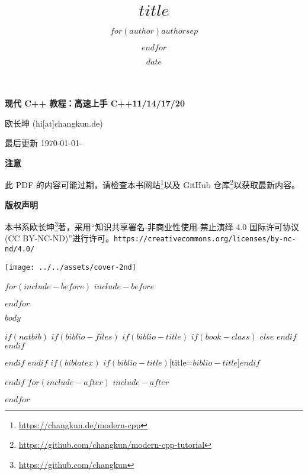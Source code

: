 \documentclass[a4paper, 10pt]{ctexart}
\title{$title$}
\author{$for(author)$$author$$sep$ \and $endfor$}
\date{$date$}
\makeatletter
\def\maxwidth{\ifdim\Gin@nat@width>\linewidth\linewidth
\else\Gin@nat@width\fi}
\let\Oldincludegraphics\includegraphics
\renewcommand{\includegraphics}[1]{\Oldincludegraphics[width=0.7\maxwidth]{#1}}
\renewcommand{\href}[2]{#2\footnote{\url{#1}}}
\makeatother
\begin{document}
\newcommand{\tightlist}{%
\setlength{\itemsep}{0pt}\setlength{\parskip}{0pt}}

\thispagestyle{plain}
\begin{center}
  
  {\LARGE\textbf{现代 C++ 教程：高速上手 C++11/14/17/20}}
  
  \vspace{1em}
  {\large 欧长坤 (hi[at]changkun.de)}
  
  \vspace{1ex}
  最后更新 \today - \revision

  \vspace{1ex}
  \textbf{注意}

  \noindent 此 PDF 的内容可能过期，请检查\href{https://changkun.de/modern-cpp}{本书网站}以及 \href{https://github.com/changkun/modern-cpp-tutorial}{GitHub 仓库}以获取最新内容。

  \vspace{1em}
  \textbf{\large 版权声明}

  \noindent 本书系\href{https://github.com/changkun}{欧长坤}著，采用“知识共享署名-非商业性使用-禁止演绎 4.0 国际许可协议 (CC BY-NC-ND)”进行许可。\texttt{\small https://creativecommons.org/licenses/by-nc-nd/4.0/}

  \vspace{7em}
  \texttt{[image: ../../assets/cover-2nd]}

\end{center}

$for(include-before)$
$include-before$

$endfor$

{
\newpage
\hypersetup{linkcolor=black}
\setcounter{tocdepth}{3}
\tableofcontents
}
\newpage

$body$

$if(natbib)$
$if(biblio-files)$
$if(biblio-title)$
$if(book-class)$
\renewcommand\bibname{$biblio-title$}
$else$
\renewcommand\refname{$biblio-title$}
$endif$
$endif$


$endif$
$endif$
$if(biblatex)$
\printbibliography$if(biblio-title)$[title=$biblio-title$]$endif$

$endif$
$for(include-after)$
$include-after$

$endfor$
\end{document}
